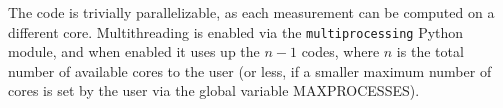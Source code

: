 \documentclass{emulateapj}
\begin{document}



 
The code is trivially parallelizable, as each measurement can be computed on a different core. Multithreading is enabled via the \verb=multiprocessing= Python module, and when enabled it uses up the $n-1$ codes, where $n$ is the total number of available cores to the user (or less, if a smaller maximum number of cores is set by the user via the global variable MAXPROCESSES).
\end{document}
